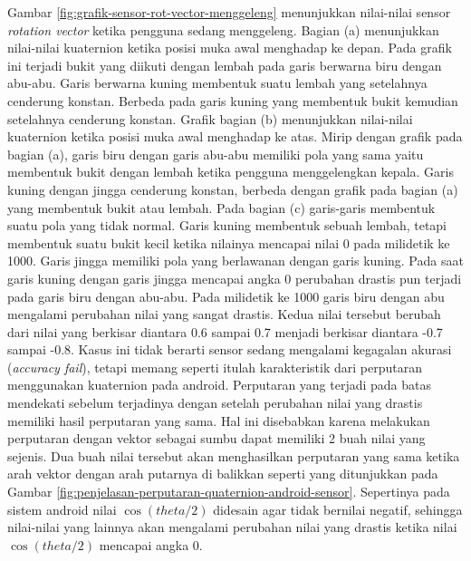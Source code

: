 Gambar \ref{fig:grafik-sensor-rot-vector-menggeleng} menunjukkan nilai-nilai sensor \textit{rotation vector} ketika pengguna sedang menggeleng. Bagian (a) menunjukkan nilai-nilai kuaternion ketika posisi muka awal menghadap ke depan. Pada grafik ini terjadi bukit yang diikuti dengan lembah pada garis berwarna biru dengan abu-abu. Garis berwarna kuning membentuk suatu lembah yang setelahnya cenderung konstan. Berbeda pada garis kuning yang membentuk bukit kemudian setelahnya cenderung konstan. Grafik bagian (b) menunjukkan nilai-nilai kuaternion ketika posisi muka awal menghadap ke atas. Mirip dengan grafik pada bagian (a), garis biru dengan garis abu-abu memiliki pola yang sama yaitu membentuk bukit dengan lembah ketika pengguna menggelengkan kepala. Garis kuning dengan jingga cenderung konstan, berbeda dengan grafik pada bagian (a) yang membentuk bukit atau lembah. Pada bagian (c) garis-garis membentuk suatu pola yang tidak normal. Garis kuning membentuk sebuah lembah, tetapi membentuk suatu bukit kecil ketika nilainya mencapai nilai 0 pada milidetik ke 1000. Garis jingga memiliki pola yang berlawanan dengan garis kuning. Pada saat garis kuning dengan garis jingga mencapai angka 0 perubahan drastis pun terjadi pada garis biru dengan abu-abu. Pada milidetik ke 1000 garis biru dengan abu mengalami perubahan nilai yang sangat drastis. Kedua nilai tersebut berubah dari nilai yang berkisar diantara 0.6 sampai 0.7 menjadi berkisar diantara -0.7 sampai -0.8. Kasus ini tidak berarti sensor sedang mengalami kegagalan akurasi (\textit{accuracy fail}), tetapi memang seperti itulah karakteristik dari perputaran menggunakan kuaternion pada android. Perputaran yang terjadi pada batas mendekati sebelum terjadinya dengan setelah perubahan nilai yang drastis memiliki hasil perputaran yang sama. Hal ini disebabkan karena melakukan perputaran dengan vektor sebagai sumbu dapat memiliki 2 buah nilai yang sejenis. Dua buah nilai tersebut akan menghasilkan perputaran yang sama ketika arah vektor dengan arah putarnya di balikkan seperti yang ditunjukkan pada Gambar \ref{fig:penjelasan-perputaran-quaternion-android-sensor}. Sepertinya pada sistem android nilai $\cos (theta/2)$ didesain agar tidak bernilai negatif, sehingga nilai-nilai yang lainnya akan mengalami perubahan nilai yang drastis ketika nilai $\cos (theta/2)$ mencapai angka 0.


